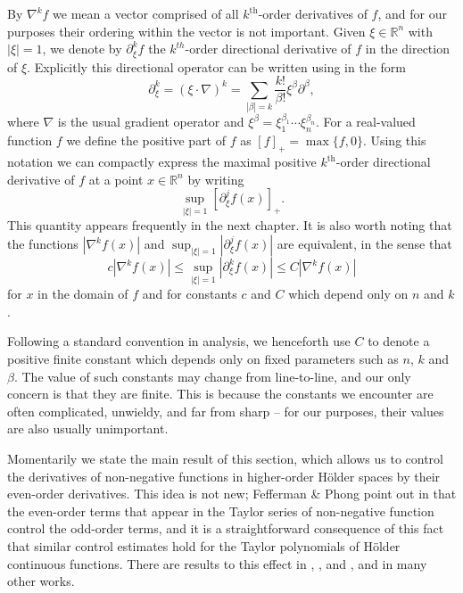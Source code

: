 \documentclass[oneside,hidelinks,indentfirst,10pt]{book}
\begin{document}
By \(\nabla^kf\) we mean a vector comprised of all \(k^\mathrm{th}\)-order derivatives of \(f\), and for our purposes their ordering within the vector is not important. Given \(\xi\in\mathbb{R}^n\) with \(|\xi|=1\), we denote by \(\partial^k_\xi f\) the \(k^{th}\)-order directional derivative of \(f\) in the direction of \(\xi\). Explicitly this directional operator can be written using in the form
\begin{equation}\label{eq:directionalop}
    \partial^k_\xi=(\xi\cdot\nabla)^k=\sum_{|\beta|=k}\frac{k!}{\beta!}\xi^\beta\partial^\beta,
\end{equation}
where \(\nabla\) is the usual gradient operator and \(\xi^\beta=\xi_1^{\beta_1}\cdots\xi_n^{\beta_n}\). For a real-valued function \(f\) we define the positive part of \(f\) as \([f]_+=\max\{f,0\}\). Using this notation we can compactly express the maximal positive \(k^\mathrm{th}\)-order directional derivative of \(f\) at a point \(x\in\mathbb{R}^n\) by writing
\[
    \sup_{|\xi|=1}[\partial^j_\xi f(x)]_+.
\]
This quantity appears frequently in the next chapter. It is also worth noting that the functions \(|\nabla^k f(x)|\) and \(\displaystyle\sup_{|\xi|=1}|\partial^j_\xi f(x)|\) are equivalent, in the sense that
\[
    c|\nabla^k f(x)|\leq \sup_{|\xi|=1}|\partial^k_\xi f(x)|\leq C|\nabla^k f(x)|
\]
for \(x\) in the domain of \(f\) and for constants \(c\) and \(C\) which depend only on \(n\) and \(k\). 


Following a standard convention in analysis, we henceforth use \(C\) to denote a positive finite constant which depends only on fixed parameters such as \(n\), \(k\) and \(\beta\). The value of such constants may change from line-to-line, and our only concern is that they are finite. This is because the constants we encounter are often complicated, unwieldy, and far from sharp -- for our purposes, their values are also usually unimportant.


Momentarily we state the main result of this section, which allows us to control the derivatives of non-negative functions in higher-order H\"older spaces by their even-order derivatives. This idea is not new; Fefferman \& Phong point out in \cite{Fefferman-Phong} that the even-order terms that appear in the Taylor series of non-negative function control the odd-order terms, and it is a straightforward consequence of this fact that similar control estimates hold for the Taylor polynomials of H\"older continuous functions. There are results to this effect in \cite{Tataru}, \cite{SOS_I}, and \cite{Bony2}, and in many other works.
\end{document}
